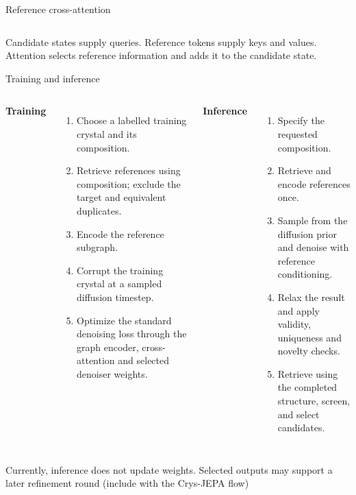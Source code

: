 \documentclass[10pt,aspectratio=169]{beamer}
\begin{document}
\begin{frame}{Reference cross-attention}
\begin{columns}[c]
\centering
\denoisercell
{}\centering
\crosscell
\end{columns}
\vspace{1mm}\small Candidate states supply queries. Reference tokens supply keys and values. Attention selects reference information and adds it to the candidate state.
\end{frame}

\begin{frame}{Training and inference}
\begin{columns}[T]
\textbf{Training}
\begin{enumerate}\setlength\itemsep{2mm}
\item Choose a labelled training crystal and its composition.
\item Retrieve references using composition; exclude the target and equivalent duplicates.
\item Encode the reference subgraph.
\item Corrupt the training crystal at a sampled diffusion timestep.
\item Optimize the standard denoising loss through the graph encoder, cross-attention and selected denoiser weights.
\end{enumerate}
\textbf{Inference}
\begin{enumerate}\setlength\itemsep{2mm}
\item Specify the requested composition.
\item Retrieve and encode references once.
\item Sample from the diffusion prior and denoise with reference conditioning.
\item Relax the result and apply validity, uniqueness and novelty checks.
\item Retrieve using the completed structure, screen, and select candidates.
\end{enumerate}
\end{columns}
\vspace{3mm}\small Currently, inference does not update weights. Selected outputs may support a later refinement round (include with the Crys-JEPA flow)
\end{frame}
\end{document}
